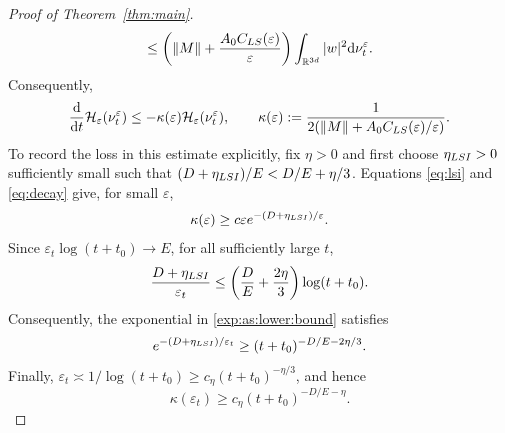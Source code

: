\documentclass[10pt,a4paper]{amsart}
\newcommand{\R}{\mathbb R}
\newcommand{\cH}{\mathcal H}
\newcommand{\dd}{\mathrm d}
\newcommand{\eps}{\varepsilon}
\theoremstyle{plain}
\theoremstyle{definition}
\begin{document}
\begin{proof}[Proof of Theorem~\ref{thm:main}]
\[ \leq\left(\|M\|+\frac{A_0C_{\rm LS}(\eps)}{\eps}\right)
       \int_{\R^{3d}}|w|^2\dd\nu_t^\eps.
\]
Consequently,
\begin{equation}\label{eq:decay}
 \frac{\dd}{\dd t}\cH_\eps(\nu_t^\eps)
 \leq-\kappa(\eps)\cH_\eps(\nu_t^\eps),\qquad
 \kappa(\eps):=\frac{1}{2(\|M\|+A_0C_{\rm LS}(\eps)/\eps)}.
\end{equation}
To record the loss in this estimate explicitly, fix $\eta>0$ and first choose
$\eta_{\rm LSI}>0$ sufficiently small such that
$(D+\eta_{\rm LSI})/E<D/E+\eta/3$. Equations
\eqref{eq:lsi} and \eqref{eq:decay} give, for small $\eps$,
\begin{align}\label{exp:as:lower:bound}
 \kappa(\eps)\geq c\eps e^{-(D+\eta_{\rm LSI})/\eps}.
\end{align}
Since $\eps_t\log(t+t_0)\to E$, for all sufficiently large $t$,
\[
 \frac{D+\eta_{\rm LSI}}{\eps_t}
 \leq\left(\frac DE+\frac{2\eta}{3}\right)\log(t+t_0).
\]
Consequently, the exponential in \eqref{exp:as:lower:bound} satisfies
\[
 e^{-(D+\eta_{\rm LSI})/\eps_t}
 \geq(t+t_0)^{-D/E-2\eta/3}.
\]
Finally,
$\eps_t\asymp1/\log(t+t_0)\geq c_\eta(t+t_0)^{-\eta/3}$, and hence
\begin{equation}\label{eq:kappalower}
 \kappa(\eps_t)\geq c_\eta(t+t_0)^{-D/E-\eta}.
\end{equation}


\end{proof}
\end{document}
